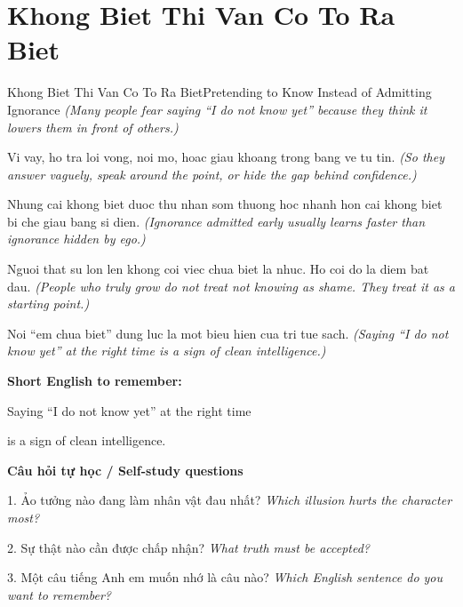 \section{Khong Biet Thi Van Co To Ra Biet}
\begin{truyen}{Khong Biet Thi Van Co To Ra Biet}{Pretending to Know Instead of Admitting Ignorance}
\textit{(Many people fear saying “I do not know yet” because they think it lowers them in front of others.)}

Vi vay, ho tra loi vong, noi mo, hoac giau khoang trong bang ve tu tin.
\textit{(So they answer vaguely, speak around the point, or hide the gap behind confidence.)}

Nhung cai khong biet duoc thu nhan som thuong hoc nhanh hon cai khong biet bi che giau bang si dien.
\textit{(Ignorance admitted early usually learns faster than ignorance hidden by ego.)}

Nguoi that su lon len khong coi viec chua biet la nhuc. Ho coi do la diem bat dau.
\textit{(People who truly grow do not treat not knowing as shame. They treat it as a starting point.)}

\end{truyen}

\begin{baihoc}
Noi “em chua biet” dung luc la mot bieu hien cua tri tue sach.
\textit{(Saying “I do not know yet” at the right time is a sign of clean intelligence.)}
\end{baihoc}

\begin{ghinhoanh}
\textbf{Short English to remember:}

Saying “I do not know yet” at the right time

is a sign of clean intelligence.

\end{ghinhoanh}

\begin{tuhocnhanh}
\textbf{Câu hỏi tự học / Self-study questions}

1. Ảo tưởng nào đang làm nhân vật đau nhất? \textit{Which illusion hurts the character most?}

2. Sự thật nào cần được chấp nhận? \textit{What truth must be accepted?}

3. Một câu tiếng Anh em muốn nhớ là câu nào? \textit{Which English sentence do you want to remember?}
\end{tuhocnhanh}
\ngancach

